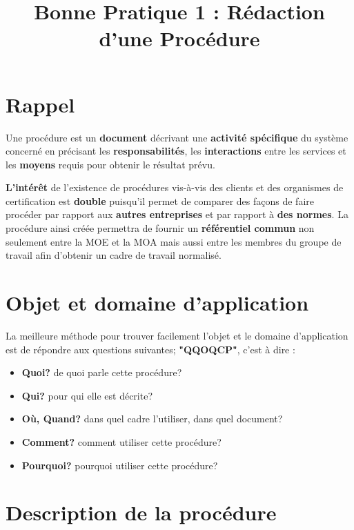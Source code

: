 \documentclass[a4paper]{article}
\begin{document}
\title{Bonne Pratique 1 : Rédaction d'une Procédure}
\maketitle

\section{Rappel}

Une procédure est un \textbf{document} décrivant une \textbf{activité spécifique} du système concerné en précisant les \textbf{responsabilités}, les \textbf{interactions} entre les services et les \textbf{moyens} requis pour obtenir le résultat prévu.

\textbf{L'intérêt} de l'existence de procédures vis-à-vis des clients et des organismes de certification est \textbf{double} puisqu'il permet de comparer des façons de faire procéder par rapport aux \textbf{autres entreprises} et par rapport à \textbf{des normes}. La procédure ainsi créée permettra de fournir un \textbf{référentiel commun} non seulement entre la MOE et la MOA mais aussi entre les membres du groupe de travail afin d'obtenir un cadre de travail normalisé.

\section{Objet et domaine d'application}


La meilleure méthode pour trouver facilement l'objet et le domaine d'application est de répondre aux questions suivantes; \textbf{"QQOQCP"}, c'est à dire :

\begin{itemize}
\item \textbf{Quoi?} de quoi parle cette procédure?
\item \textbf{Qui?} pour qui elle est décrite?
\item \textbf{Où, Quand?} dans quel cadre l'utiliser, dans quel document?
\item \textbf{Comment?} comment utiliser cette procédure?
\item \textbf{Pourquoi?} pourquoi utiliser cette procédure?
\end{itemize}

\section{Description de la procédure}
\end{document}
